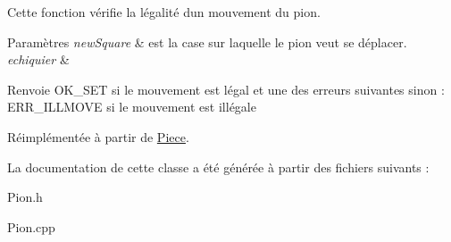 Cette fonction vérifie la légalité d\textquotesingle{}un mouvement du pion. 


\begin{DoxyParams}{Paramètres}
{\em new\+Square} & est la case sur laquelle le pion veut se déplacer. \\
\hline
{\em echiquier} & \\
\hline
\end{DoxyParams}
\begin{DoxyReturn}{Renvoie}
O\+K\+\_\+\+S\+ET si le mouvement est légal et une des erreurs suivantes sinon \+: E\+R\+R\+\_\+\+I\+L\+L\+M\+O\+VE si le mouvement est illégale 
\end{DoxyReturn}


Réimplémentée à partir de \hyperlink{classPiece_a7003f6b90284237191f00bb6038a3bd3}{Piece}.



La documentation de cette classe a été générée à partir des fichiers suivants \+:\begin{DoxyCompactItemize}
\item 
Pion.\+h\item 
Pion.\+cpp\end{DoxyCompactItemize}
